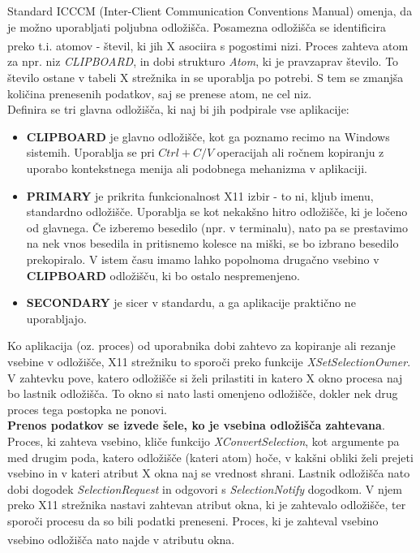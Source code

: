 \documentclass[12pt, A4]{article}
\begin{document}
	Standard ICCCM (Inter-Client Communication Conventions Manual) omenja, da je možno uporabljati poljubna odložišča. Posamezna odložišča se identificira preko t.i. atomov\textsuperscript{\cite{xdocs}} - števil, ki jih X asociira s pogostimi nizi. Proces zahteva atom za npr. niz \textit{CLIPBOARD}, in dobi strukturo \textit{Atom}, ki je pravzaprav število. To število ostane v tabeli X strežnika in se uporablja po potrebi. S tem se zmanjša količina prenesenih podatkov, saj se prenese atom, ne cel niz. \\
	
	Definira se tri glavna odložišča, ki naj bi jih podpirale vse aplikacije:
	\begin{itemize}
		\item \textbf{CLIPBOARD} je glavno odložišče, kot ga poznamo recimo na Windows sistemih. Uporablja se pri $Ctrl+C/V$ operacijah ali ročnem kopiranju z uporabo kontekstnega menija ali podobnega mehanizma v aplikaciji.
		\item \textbf{PRIMARY} je prikrita funkcionalnost X11 izbir - to ni, kljub imenu, standardno odložišče. Uporablja se kot nekakšno hitro odložišče, ki je ločeno od glavnega. Če izberemo besedilo (npr. v terminalu), nato pa se prestavimo na nek vnos besedila in pritisnemo kolesce na miški, se bo izbrano besedilo prekopiralo. V istem času imamo lahko popolnoma drugačno vsebino v \textbf{CLIPBOARD} odložišču, ki bo ostalo nespremenjeno.
		\item \textbf{SECONDARY} je sicer v standardu, a ga aplikacije praktično ne uporabljajo.
	\end{itemize}
	
	Ko aplikacija (oz. proces) od uporabnika dobi zahtevo za kopiranje ali rezanje vsebine v odložišče, X11 strežniku to sporoči preko funkcije \textit{XSetSelectionOwner}. V zahtevku pove, katero odložišče si želi prilastiti in katero X okno procesa naj bo lastnik odložišča. To okno si nato lasti omenjeno odložišče, dokler nek drug proces tega postopka ne ponovi. \\
		
	\textbf{Prenos podatkov se izvede šele, ko je vsebina odložišča zahtevana}. Proces, ki zahteva vsebino, kliče funkcijo \textit{XConvertSelection}, kot argumente pa med drugim poda, katero odložišče (kateri atom) hoče, v kakšni obliki želi prejeti vsebino in v kateri atribut X okna naj se vrednost shrani. Lastnik odložišča nato dobi dogodek \textit{SelectionRequest} in odgovori s \textit{SelectionNotify} dogodkom. V njem preko X11 strežnika nastavi zahtevan atribut okna, ki je zahtevalo odložišče, ter sporoči procesu da so bili podatki preneseni. Proces, ki je zahteval vsebino vsebino odložišča nato najde v atributu okna\textsuperscript{\cite{icccm}}.
\end{document}
